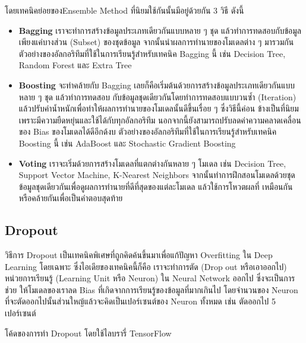 โดยเทคนิคย่อยของEnsemble Method ที่นิยมใช้กันนั้นมีอยู่ด้วยกัน 3 วิธี ดังนี้

\begin{itemize}[topsep=0pt]
    \item \textbf{Bagging} เราจะทำการสร้างข้อมูลประเภทเดียวกันแบบหลาย ๆ ชุด แล้วทำการทดสอบกับข้อมูลเพียงแค่บางส่วน (Subset) 
    ของชุดข้อมูล จากนั้นนำผลการทำนายของโมเดลต่าง ๆ มารวมกัน ตัวอย่างของอัลกอริทึมที่ใช้ในการเรียนรู้สำหรับเทคนิค Bagging นี้ เช่น 
    Decision Tree, Random Forest และ Extra Tree

    \item \textbf{Boosting} จะทำคล้ายกับ Bagging เลยก็คือเริ่มต้นด้วยการสร้างข้อมูลประเภทเดียวกันแบบหลาย ๆ ชุด แล้วทำการทดสอบ%
    กับข้อมูลชุดเดียวกันโดยทำการทดสอบแบบวนซ้ำ (Iteration) แล้วปรับค่าน้ำหนักเพื่อทำให้ผลการทำนายของโมเดลนั้นดีขึ้นเรื่อย ๆ ซึ่งวิธีนี้ค่อน%
    ข้างเป็นที่นิยมเพราะมีความยืดหยุ่นและใช้ได้กับทุกอัลกอริทึม นอกจากนี้ยังสามารถปรับลดค่าความคลาดเคลื่อนของ Bias ของโมเดลได้ดีอีกด้งบ 
    ตัวอย่างของอัลกอริทึมที่ใช้ในการเรียนรู้สำหรับเทคนิค Boosting นี้ เช่น AdaBoost และ Stochastic Gradient Boosting

    \item \textbf{Voting} เราจะเริ่มด้วยการสร้างโมเดลที่แตกต่างกันหลาย ๆ โมเดล เช่น Decision Tree, Support Vector Machine, 
    K-Nearest Neighbors จากนั้นทำการฝึกสอนโมเดลด้วยชุดข้อมูลชุดเดียวกันเพื่อดูผลการทำนายที่ดีที่สุดของแต่ละโมเดล แล้วใช้การโหวตผลที่%
    เหมือนกันหรือคล้ายกันเพื่อเป็นคำตอบสุดท้าย
\end{itemize}

\subsection{Dropout}
\label{ssec:dropout}

วิธีการ Dropout เป็นเทคนิคพิเศษที่ถูกคิดค้นขึ้นมาเพื่อแก้ปัญหา Overfitting ใน Deep Learning โดยเฉพาะ ซึ่งไอเดียของเทคนิคนี้ก็คือ%
เราจะทำการตัด (Drop out หรือเอาออกไป) หน่วยการเรียนรู้ (Learning Unit หรือ Neuron) ใน Neural Network ออกไป ซึ่งจะเป็นการช่วย%
ให้โมเดลของเราลด Bias ที่เกิดจากการเรียนรู้ของข้อมูลที่มากเกินไป โดยจำนวนของ Neuron ที่จะตัดออกไปนั้นส่วนใหญ้แล้วจะคิดเป็นเปอร์เซนต์ของ
Neuron ทั้งหมด เช่น ตัดออกไป 5 เปอร์เซนต์

โค้ดของการทำ Dropout โดยใช้ไลบรารี่ TensorFlow

